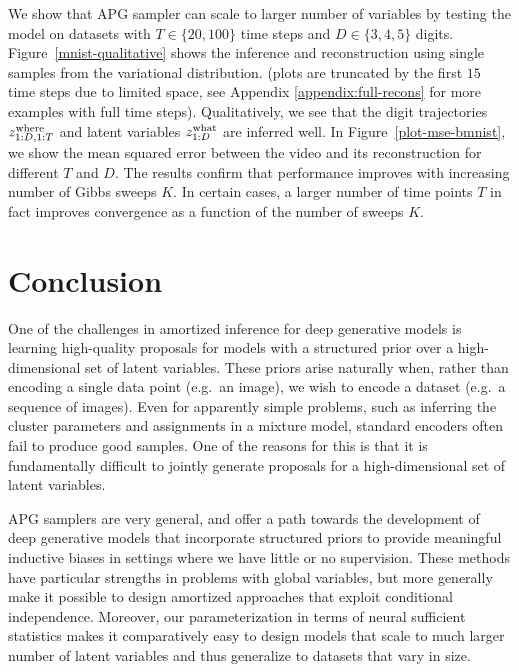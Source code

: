 \documentclass{article}
\theoremstyle{definition}
\begin{document}
We show that APG sampler can scale to larger number of variables by testing the model on datasets with $T\in \{20, 100\}$ time steps  and $D \in \{3, 4, 5\}$ digits. Figure~\ref{mnist-qualitative} shows the inference and reconstruction using single samples from the variational distribution. (plots are truncated by the first $15$ time steps due to limited space, see Appendix \ref{appendix:full-recons} for more examples with full time steps). 
Qualitatively, we see that the digit trajectories $z_{1:D, 1:T}^{\mathrm{where}}$ and latent variables $z_{1:D}^{\mathrm{what}}$ are inferred well.
In Figure~\ref{plot-mse-bmnist}, we show the mean squared error between the video and its reconstruction for different $T$ and $D$.
The results confirm that performance improves with increasing number of Gibbs sweeps $K$.
In certain cases, a larger number of time points $T$ in fact improves convergence as a function of the number of sweeps $K$.


\section{Conclusion}
One of the challenges in amortized inference for deep generative models is learning high-quality proposals for models with a structured prior over a high-dimensional set of latent variables. These priors arise naturally when, rather than encoding a single data point (e.g.~an image), we wish to encode a dataset (e.g.~a sequence of images). 
Even for apparently simple problems, such as inferring the cluster parameters and assignments in a mixture model, standard encoders often fail to produce good samples. One of the reasons for this is that it is fundamentally difficult to jointly generate proposals for a high-dimensional set of latent variables.

APG samplers are very general, and offer a path towards the development of deep generative models that incorporate structured priors to provide meaningful inductive biases in settings where we have little or no supervision. These methods have particular strengths in problems with global variables, but more generally make it possible to design amortized approaches that exploit conditional independence. Moreover, our parameterization in terms of neural sufficient statistics makes it comparatively easy to design models that scale to much larger number of latent variables and thus generalize to datasets that vary in size. 
\end{document}
